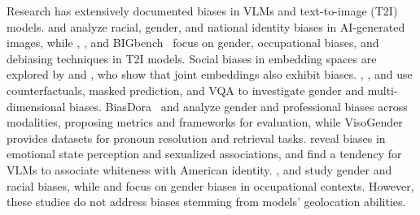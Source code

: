 Research has extensively documented biases in VLMs and text-to-image (T2I) models.
\citet{fraser2024examining} and \citet{ghosh2023person} analyze racial, gender, and national identity biases in AI-generated images, while \citet{wang2024new}, \citet{nakashima2023societal}, and BIGbench~\cite{luo2024bigbench} focus on gender, occupational biases, and debiasing techniques in T2I models.
Social biases in embedding spaces are explored by \citet{brinkmann2023multidimensional} and \citet{ross2021measuring}, who show that joint embeddings also exhibit biases.
\citet{zhang2022counterfactually}, \citet{srinivasan2022worst}, and \citet{ruggeri2023multi} use counterfactuals, masked prediction, and VQA to investigate gender and multi-dimensional biases.
BiasDora~\cite{raj2024biasdora} and \citet{sathe2024unified} analyze gender and professional biases across modalities, proposing metrics and frameworks for evaluation, while VisoGender~\cite{hall2023visogender} provides datasets for pronoun resolution and retrieval tasks. \citet{wolfe2023contrastive} reveal biases in emotional state perception and sexualized associations, and \citet{wolfe2022american} find a tendency for VLMs to associate whiteness with American identity. \citet{wan2023biasasker}, \citet{zhao2024gender} and \citet{du2025faircode} study gender and racial biases, while \citet{wan2024male} and \citet{huang2025fact} focus on gender biases in occupational contexts.
However, these studies do not address biases stemming from models' geolocation abilities.